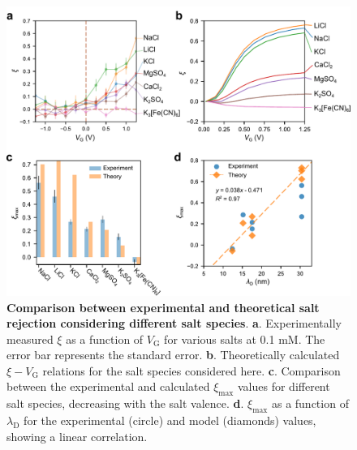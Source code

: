 \documentclass[journal=langd5,email=true, hyperref=true, keywords=false]{achemso}
\begin{document}
\begin{figure}[htbp]
  \centering
  \includegraphics[width=0.95\linewidth]{img/fig6.pdf}
  \caption{\textbf{Comparison between experimental and theoretical
      salt rejection considering different salt
      species}. \textbf{a}. Experimentally measured $\xi$ as a
    function of $V_{\mathrm{G}}$ for various salts at 0.1 mM. The
    error bar represents the standard error. \textbf{b}. Theoretically
    calculated $\xi-V_{\mathrm{G}}$ relations for the salt species
    considered here. \textbf{c}. Comparison between the experimental
    and calculated $\xi_{\mathrm{max}}$ values for different salt
    species, decreasing with the salt
    valence. \textbf{d}. $\xi_{\mathrm{max}}$ as a function of
    $\lambda_{\mathrm{D}}$ for the experimental (circle) and model
    (diamonds) values, showing a linear correlation.}
  \label{fig:6}
\end{figure}
\end{document}
